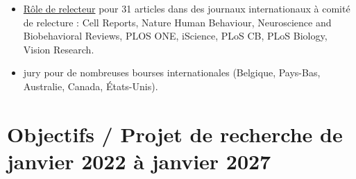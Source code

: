 \documentclass[10pt,french,a4paper,twoside]{article}%
\begin{document}
\begin{itemize}
	\item \href{https://orcid.org/my-orcid?orcid=0000-0002-9536-010X}{Rôle de relecteur} pour 31 articles dans des journaux internationaux à comité de relecture : Cell Reports, Nature Human Behaviour, Neuroscience and Biobehavioral Reviews, PLOS ONE, iScience, PLoS CB, PLoS Biology, Vision Research.

	\item jury pour de nombreuses bourses internationales (Belgique, Pays-Bas, Australie, Canada, États-Unis).


\end{itemize}

\newpage
\section{Objectifs / Projet de recherche de janvier 2022 à janvier 2027}

% 

\newpage
\printbibliography
\end{document}
